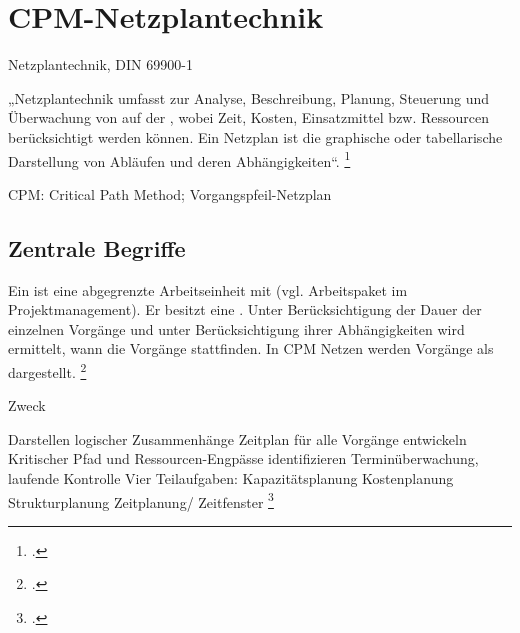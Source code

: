 \documentclass{lehramt-informatik}
\begin{document}

\chapter{CPM-Netzplantechnik}

\begin{quellen}
\item \cite{wiki:netzplantechnik}
\item \cite{wiki:methode-kritischer-pfad}
\end{quellen}

Netzplantechnik, DIN 69900-1

„Netzplantechnik umfasst  zur Analyse,
Beschreibung, Planung, Steuerung und Überwachung von 
auf der , wobei Zeit, Kosten,
Einsatzmittel bzw. Ressourcen berücksichtigt werden können. Ein Netzplan
ist die graphische oder tabellarische Darstellung von Abläufen und deren
Abhängigkeiten“.
\footcite[Seite 14]{sosy:fs:3}

CPM: Critical Path Method; Vorgangspfeil-Netzplan

%

\section{Zentrale Begriffe}

Ein  ist eine abgegrenzte Arbeitseinheit mit
 (vgl. Arbeitspaket im Projektmanagement).
Er besitzt eine .
%
Unter Berücksichtigung der Dauer der einzelnen Vorgänge und unter
Berücksichtigung ihrer Abhängigkeiten wird ermittelt, wann die Vorgänge
stattfinden.
%
In CPM Netzen werden Vorgänge als 
dargestellt.
\footcite[Seite 15]{sosy:fs:3}

Zweck

Darstellen logischer Zusammenhänge
Zeitplan für alle Vorgänge entwickeln
Kritischer Pfad und Ressourcen-Engpässe identifizieren
Terminüberwachung, laufende Kontrolle
Vier Teilaufgaben:
Kapazitätsplanung
Kostenplanung
Strukturplanung
Zeitplanung/ Zeitfenster
\footcite[Seite 22]{sosy:fs:3}
%
\end{document}
